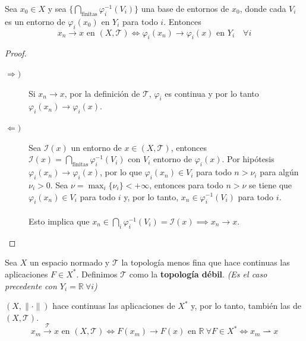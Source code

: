 \begin{prop}
    Sea $x_0 \in X$ y sea $\{\bigcap\limits_{\text{finitas}} \varphi_i^{-1}(V_i)\}$ una base de entornos de $x_0$, donde cada $V_i$ es un entorno de $\varphi_i(x_0)$ en $Y_i$ para todo $i$. Entonces
    \begin{equation*}
        x_n \to x \text{ en } (X, \mathcal{T}) \iff \varphi_i(x_n) \to \varphi_i(x) \text{ en } Y_i \quad \forall i
    \end{equation*}
\begin{proof}
    \begin{description}
        \item[$\Longrightarrow)$] Si $x_n \to x$, por la definición de $\mathcal{T}$, $\varphi_i$ es continua y por lo tanto $\varphi_i(x_n) \to \varphi_i(x)$.  
        \item[$\Longleftarrow)$] Sea $\mathcal{I}(x)$ un entorno de $x \in (X, \mathcal{T})$, entonces $\mathcal{I}(x) = \bigcap\limits_{\text{finitas}} \varphi_i^{-1}(V_i)$ con $V_i$ entorno de $\varphi_i(x)$. Por hipótesis $\varphi_i(x_n) \to \varphi_i(x)$, por lo que $\varphi_i(x_n) \in V_i$ para todo $n > \nu_i$ para algún $\nu_i > 0$. Sea $\nu = \max_i \{\nu_i\} < +\infty$, entonces para todo $n > \nu$ se tiene que $\varphi_i(x_n) \in V_i$ para todo $i$ y, por lo tanto, $x_n \in \varphi_i^{-1}(V_i)$ para todo $i$. \\ \\
        \noindent
        Esto implica que $x_n \in \bigcap_i \varphi_i^{-1}(V_i) = \mathcal{I}(x) \implies x_n \to x$. 
    \end{description}
\end{proof}
\end{prop}

\begin{definicion}
    Sea $X$ un espacio normado y $\mathcal{T}$ la topología menos fina que hace continuas las aplicaciones $F \in X^*$. Definimos $\mathcal{T}$ como la \textbf{topología débil}. \textit{\small (Es el caso precedente con $Y_i = \mathbb{R} \ \forall i$)}
\end{definicion}

\begin{observacion}
    $(X, \|\cdot\|)$ hace continuas las aplicaciones de $X^*$ y, por lo tanto, también las de $(X, \mathcal{T})$.
    \[ x_m \xrightarrow{\mathcal{T}} x \text{ en } (X, \mathcal{T}) \iff F(x_m) \longrightarrow F(x) \text{ en } \mathbb{R} \ \forall F \in X^* \iff x_m \rightharpoonup x \]

\end{observacion}


